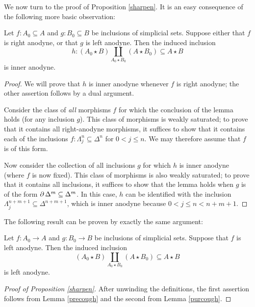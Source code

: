 We now turn to the proof of Proposition \ref{sharpen}. It is an easy consequence of the following more basic observation:

\begin{lemma}\label{precough}
Let $f: A_0 \subseteq A$ and $g: B_0 \subseteq B$ be inclusions of simplicial sets.
Suppose either that $f$ is right anodyne, or that $g$ is left anodyne. Then the induced inclusion
$$ h: (A_0 \star B) \coprod_{ A_0 \star B_0 } (A \star B_0) \subseteq A \star B$$
is inner anodyne.
\end{lemma}

\begin{proof}
We will prove that $h$ is inner anodyne whenever $f$ is right anodyne; the other assertion follows by a dual argument. 

Consider the class of {\em all} morphisms $f$ for which the conclusion of the lemma holds (for any inclusion $g$). This class of morphisms is weakly saturated; to prove that it contains all right-anodyne morphisms, it suffices to show that it contains each of the inclusions
$f: \Lambda^n_{j} \subseteq \Delta^n$ for $0 < j \leq n$. We may therefore assume that $f$ is of this form.

Now consider the collection of all inclusions $g$ for which $h$ is inner anodyne (where $f$ is now fixed). This class of morphisms is also weakly saturated; to prove that it contains all inclusions, it suffices to show that the lemma holds when $g$ is of the form $\operatorname{\partial} \Delta^m \subseteq \Delta^m$. In this case, $h$ can be identified with the inclusion $\Lambda^{n+m+1}_j \subseteq \Delta^{n+m+1}$, which is inner anodyne because $0 < j \leq n < n+m+1$.
\end{proof}

The following result can be proven by exactly the same argument:

\begin{lemma}[Joyal]\label{purcough}
Let $f: A_0 \rightarrow A$ and $g: B_0 \rightarrow B$ be inclusions of simplicial sets.
Suppose that $f$ is left anodyne. Then the induced inclusion
$$ (A_0 \star B) \coprod_{ A_0 \star B_0 } (A \star B_0) \subseteq A \star B$$
is left anodyne.
\end{lemma}

\begin{proof}[Proof of Proposition \ref{sharpen}]
After unwinding the definitions, the first assertion follows from Lemma \ref{precough} and the second from Lemma \ref{purcough}.
\end{proof}

